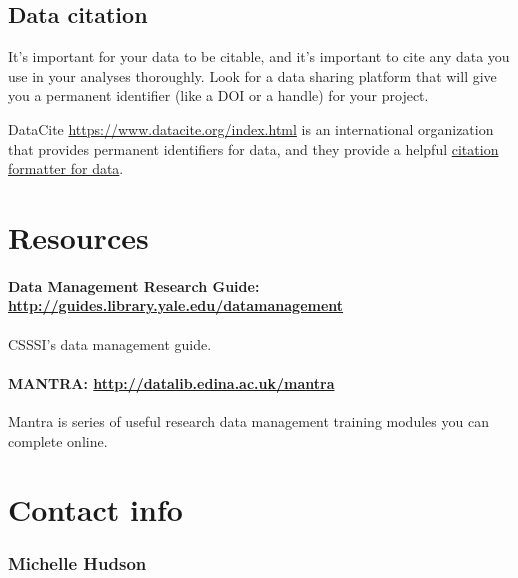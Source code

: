 \subsection{Data citation}\label{data-citation}

It's important for your data to be citable, and it's important to cite
any data you use in your analyses thoroughly. Look for a data sharing
platform that will give you a permanent identifier (like a DOI or a
handle) for your project.

DataCite \url{https://www.datacite.org/index.html} is an international
organization that provides permanent identifiers for data, and they
provide a helpful \href{https://www.datacite.org/citation.html}{citation
formatter for data}.

\section{Resources}\label{resources}

\paragraph{\texorpdfstring{Data Management Research Guide:
\url{http://guides.library.yale.edu/datamanagement}}{Data Management Research Guide: http://guides.library.yale.edu/datamanagement}}\label{data-management-research-guide-httpguides.library.yale.edudatamanagement}

CSSSI's data management guide.

\paragraph{\texorpdfstring{MANTRA:
\href{http://datalib.edina.ac.uk/mantra/}{http://datalib.edina.ac.uk/mantra}}{MANTRA: http://datalib.edina.ac.uk/mantra}}\label{mantra-httpdatalib.edina.ac.ukmantra}

Mantra is series of useful research data management training modules you
can complete online.

\section{Contact info}\label{contact-info}

\subsubsection{Michelle Hudson}\label{michelle-hudson-1}

